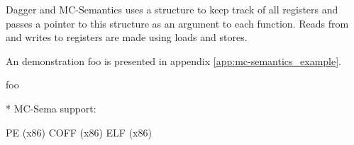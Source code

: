 Dagger and MC-Semantics uses a structure to keep track of all registers and passes a pointer to this structure as an argument to each function. Reads from and writes to registers are made using loads and stores.





An demonstration foo is presented in appendix \ref{app:mc-semantics_example}.

foo \cite{mcsema}

* MC-Sema support:

PE (x86)
COFF (x86)
ELF (x86)
